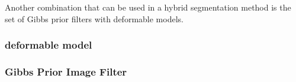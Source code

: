 Another combination that can be used in a hybrid segmentation method is the
set of Gibbs prior filters with deformable models.

\subsubsection{deformable model}
\ifitkFullVersion

\fi


\subsubsection{Gibbs Prior Image Filter}
\ifitkFullVersion

\fi

